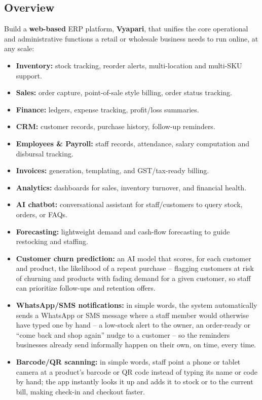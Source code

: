 \documentclass[11pt,a4paper]{article}
\begin{document}
\subsection{Overview}
Build a \textbf{web-based} ERP platform, \textbf{Vyapari}, that unifies the core operational and administrative functions a retail or wholesale business needs to run online, at any scale:
\begin{itemize}[leftmargin=0.7cm]
    \item \textbf{Inventory:} stock tracking, reorder alerts, multi-location and multi-SKU support.
    \item \textbf{Sales:} order capture, point-of-sale style billing, order status tracking.
    \item \textbf{Finance:} ledgers, expense tracking, profit/loss summaries.
    \item \textbf{CRM:} customer records, purchase history, follow-up reminders.
    \item \textbf{Employees \& Payroll:} staff records, attendance, salary computation and disbursal tracking.
    \item \textbf{Invoices:} generation, templating, and GST/tax-ready billing.
    \item \textbf{Analytics:} dashboards for sales, inventory turnover, and financial health.
    \item \textbf{AI chatbot:} conversational assistant for staff/customers to query stock, orders, or FAQs.
    \item \textbf{Forecasting:} lightweight demand and cash-flow forecasting to guide restocking and staffing.
    \item \textbf{Customer churn prediction:} an AI model that scores, for each customer and product, the likelihood of a repeat purchase -- flagging customers at risk of churning and products with fading demand for a given customer, so staff can prioritize follow-ups and retention offers.
    \item \textbf{WhatsApp/SMS notifications:} in simple words, the system automatically sends a WhatsApp or SMS message where a staff member would otherwise have typed one by hand -- a low-stock alert to the owner, an order-ready or ``come back and shop again'' nudge to a customer -- so the reminders businesses already send informally happen on their own, on time, every time.
    \item \textbf{Barcode/QR scanning:} in simple words, staff point a phone or tablet camera at a product's barcode or QR code instead of typing its name or code by hand; the app instantly looks it up and adds it to stock or to the current bill, making check-in and checkout faster.
\end{itemize}
\end{document}
